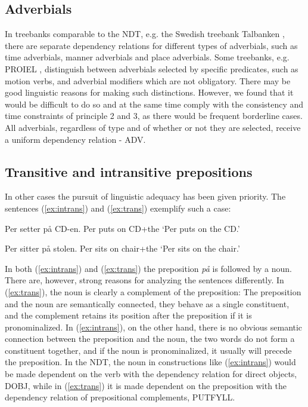 \documentclass[11pt,a4paper]{article}
\begin{document}
\subsection{Adverbials}
In treebanks comparable to the NDT, e.g. the Swedish treebank Talbanken \cite{Niv:Nil:Hal:2006}, there are separate dependency relations for different types of adverbials, such as time adverbials, manner adverbials and place adverbials. Some treebanks, e.g. PROIEL \cite{Hau:Joh:Eck:Wel:Her:Mut:2009}, distinguish between adverbials selected by specific predicates, such as motion verbs, and adverbial modifiers which are not obligatory. There may be good linguistic reasons for making such distinctions. However, we found that it would be difficult to do so and at the same time comply with the consistency and time constraints of principle 2 and 3, as there would be frequent borderline cases.
All adverbials, regardless of type and of whether or not they are selected, receive a uniform dependency relation - ADV.

\subsection{Transitive and intransitive prepositions}
In other cases the pursuit of linguistic adequacy has been given priority. The sentences (\ref{ex:intrans}) and (\ref{ex:trans}) exemplify such a case:

\begin{examples}
\item\label{ex:intrans}
\gll Per setter på CD-en.
Per puts on CD+the
\glt `Per puts on the CD.'
\glend

\item\label{ex:trans}
\gll Per sitter på stolen.
Per sits on chair+the
\glt `Per sits on the chair.'
\glend
\end{examples}

In both (\ref{ex:intrans}) and (\ref{ex:trans}) the preposition \emph{på} is followed by a noun. There are, however, strong reasons for analyzing the sentences differently. In (\ref{ex:trans}), the noun is clearly a complement of the preposition: The preposition and the noun are semantically connected, they behave as a single constituent, and the complement retains its position after the preposition if it is pronominalized. In (\ref{ex:intrans}), on the other hand, there is no obvious semantic connection between the preposition and the noun, the two words do not form a constituent together, and if the noun is pronominalized, it usually will precede the preposition. In the NDT, the noun in constructions like (\ref{ex:intrans}) would be made dependent on the verb with the dependency relation for direct objects, DOBJ, while in (\ref{ex:trans}) it is made dependent on the preposition with the dependency relation of prepositional complements, PUTFYLL.
\end{document}
